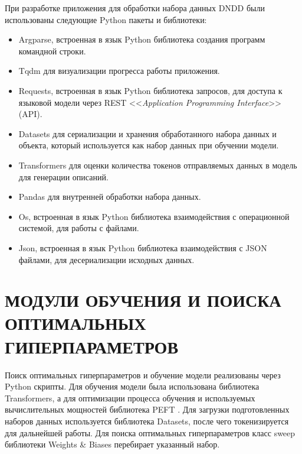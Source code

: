 При разработке приложения для обработки набора данных DNDD были использованы следующие Python пакеты и библиотеки:
\begin{itemize}
    \item Argparse, встроенная в язык Python библиотека создания программ командной строки.
    \item Tqdm \cite{tqdm-docs} для визуализации прогресса работы приложения.
    \item Requests, встроенная в язык Python библиотека запросов, для доступа к языковой модели через REST <<\textit{Application Programming Interface}>> (API).
    \item Datasets \cite{hf-datasets-docs} для сериализации и хранения обработанного набора данных и объекта, который используется как набор данных при обучении модели.
    \item Transformers \cite{transformers-docs} для оценки количества токенов отправляемых данных в модель для генерации описаний.
    \item Pandas \cite{pandas-docs} для внутренней обработки набора данных.
    \item Os, встроенная в язык Python библиотека взаимодействия с операционной системой, для работы с файлами.
    \item Json, встроенная в язык Python библиотека взаимодействия с JSON файлами, для десериализации исходных данных.
\end{itemize}

\section{МОДУЛИ ОБУЧЕНИЯ И ПОИСКА ОПТИМАЛЬНЫХ ГИПЕРПАРАМЕТРОВ}
Поиск оптимальных гиперпараметров и обучение модели реализованы через Python скрипты. Для обучения модели была использована библиотека Transformers, а для оптимизации процесса обучения и используемых вычислительных мощностей библиотека PEFT \cite{peft-docs}. Для загрузки подготовленных наборов данных используется библиотека Datasets, после чего токенизируется для дальнейшей работы. Для поиска оптимальных гиперпараметров класс sweep библиотеки Weights \& Biases \cite{wandb-docs} перебирает указанный набор.

